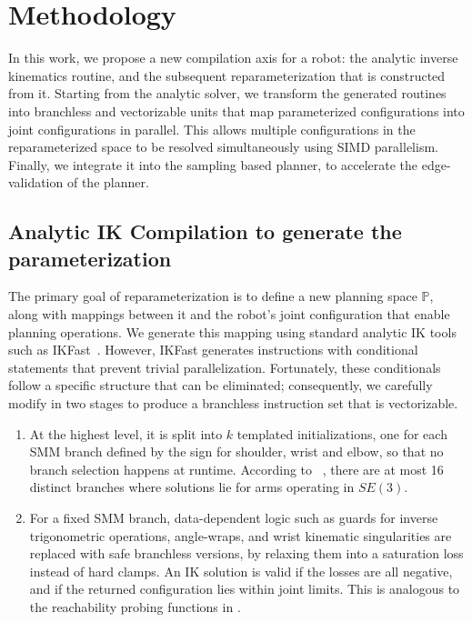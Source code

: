 \documentclass[letterpaper, 10 pt, conference]{ieeeconf}
\begin{document}
\section{Methodology}
In this work, we propose a new compilation axis for a robot: the analytic inverse kinematics routine, and the subsequent reparameterization that is constructed from it. Starting from the analytic solver, we transform the generated routines into branchless and vectorizable units that map parameterized configurations into joint configurations in parallel. This allows multiple configurations in the reparameterized space to be resolved simultaneously using SIMD parallelism. Finally, we integrate it into the sampling based planner, to accelerate the edge-validation of the planner.

\subsection{Analytic IK Compilation to generate the parameterization}
\label{sec:compileik}
The primary goal of reparameterization is to define a new planning space $\mathbb{P}$, along with mappings between it and the robot's joint configuration that enable planning operations. We generate this mapping using standard analytic IK tools such as IKFast~\cite{ikfast}. However, IKFast generates instructions with conditional statements that prevent trivial parallelization. Fortunately, these conditionals follow a specific structure that can be eliminated; consequently, we carefully modify in two stages to produce a branchless instruction set that is vectorizable. 
\begin{enumerate}
    \item At the highest level, it is split into $k$ templated initializations, one for each SMM branch defined by the sign for shoulder, wrist and elbow, so that no branch selection happens at runtime. According to ~\cite{burdick1989inverse}, there are at most 16 distinct branches where solutions lie for arms operating in $SE(3)$.
    \item For a fixed SMM branch, data-dependent logic such as guards for inverse trigonometric operations, angle-wraps, and wrist kinematic singularities are replaced with safe branchless versions, by relaxing them into a saturation loss instead of hard clamps. An IK solution is valid if the losses are all negative, and if the returned configuration lies within joint limits. This is analogous to the reachability probing functions in \cite[\S 4]{cohn2026framework}.
\end{enumerate}
\end{document}
